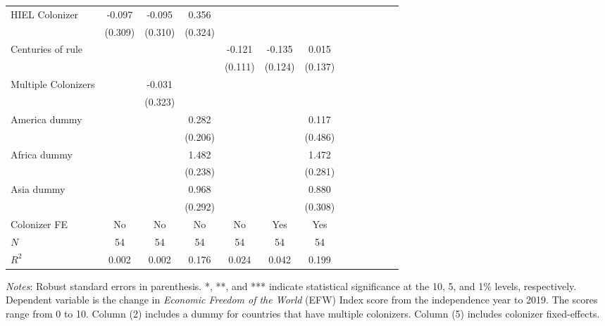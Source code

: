 \begin{sidewaystable}[h!]
\begin{threeparttable}
\begin{center}
\begin{minipage}{\textwidth}
\begin{tabular*}{\textwidth}{@{\extracolsep{\fill}}lcccccccccccc@{\extracolsep{\fill}}}
HIEL Colonizer &     -0.097         &     -0.095         &       0.356         \\
            &     (0.309)         &     (0.310)         &     (0.324)         \\
[0.125em]
Centuries of rule &       & & &     -0.121         &      -0.135         &      0.015         \\
            &&&&     (0.111)         &     (0.124)         &     (0.137)         \\
[0.125em]
Multiple Colonizers    &                     &     -0.031         &                     \\
            &                     &     (0.323)         &                     \\
America dummy    &                     &                     &       0.282 &                     &                     &       0.117         \\
                 &                     &                     &     (0.206)         &                     &                     &     (0.486)         \\
[0.125em]
Africa dummy     &                     &                     &       1.482\sym{***}  &                     &                     &       1.472\sym{***}\\
                &                     &                     &     (0.238) &                     &                     &     (0.281)         \\
[0.125em]
Asia dummy   &                     &                     &       0.968\sym{***} &                     &                     &       0.880\sym{***}\\
            &                     &                     &     (0.292) &                     &                     &     (0.308)         \\
[0.25em]
Colonizer FE & No & No & No & No & Yes & Yes\\
\hline
\(N\)       &          54         &          54         &          54         &        54         &          54         &          54         \\
\(R^{2}\)   &       0.002         &       0.002         &       0.176       &  0.024         &       0.042         &       0.199  \\
\hline
\end{tabular*}
\begin{tablenotes}
\small
\item \textit{Notes}: Robust standard errors in parenthesis. *, **, and *** indicate statistical significance at the 10, 5, and 1\% levels, respectively. Dependent variable is the change in \textit{Economic Freedom of the World} (EFW) Index score from the independence year to 2019. The scores range from 0 to 10. Column (2) includes a dummy for countries that have multiple colonizers. Column (5) includes colonizer fixed-effects.

\end{tablenotes}
\end{minipage}
\end{center}
\end{threeparttable}
\end{sidewaystable}
